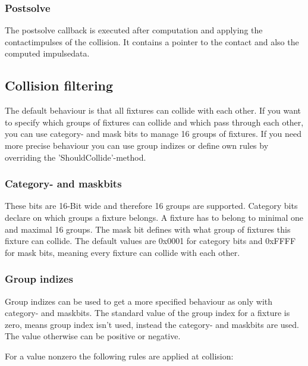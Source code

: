\documentclass[10pt,a4paper,DIV=11]{scrreprt}
\begin{document}
\subsubsection*{Postsolve}
The postsolve callback is executed after computation and applying the contactimpulses of the collision. It contains a pointer to the contact and also the computed impulsedata.

\subsection{Collision filtering}
The default behaviour is that all fixtures can collide with each other. If you want to specify which groups of fixtures can collide and which pass through each other, you can use category- and mask bits to manage 16 groups of fixtures. If you need more precise behaviour you can use group indizes or define own rules by overriding the 'ShouldCollide'-method.

\subsubsection*{Category- and maskbits}

These bits are 16-Bit wide and therefore 16 groups are supported.
Category bits declare on which groups a fixture belongs. A fixture has to belong to minimal one and maximal 16 groups.
The mask bit defines with what group of fixtures this fixture can collide. The default values are 0x0001 for category bits and 0xFFFF for mask bits, meaning every fixture can collide with each other.

\subsubsection*{Group indizes}
Group indizes can be used to get a more specified behaviour as only with category- and maskbits.
The standard value of the group index for a fixture is zero, means group index isn't used, instead the category- and maskbits are used. The value otherwise can be positive or negative.

For a value nonzero the following rules are applied at collision: \\

   \\
\\
\end{document}
